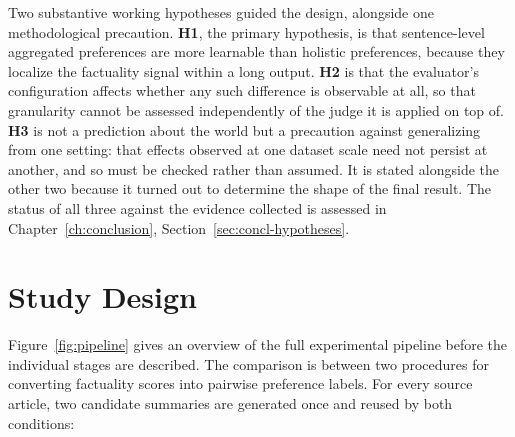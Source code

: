 Two substantive working hypotheses guided the design, alongside one
methodological precaution. \textbf{H1}, the primary hypothesis, is that
sentence-level aggregated preferences are more learnable than holistic
preferences, because they localize the factuality signal within a long output.
\textbf{H2} is that the evaluator's configuration affects whether any such
difference is observable at all, so that granularity cannot be assessed
independently of the judge it is applied on top of. \textbf{H3} is not a
prediction about the world but a precaution against generalizing from one
setting: that effects observed at one dataset scale need not persist at
another, and so must be checked rather than assumed. It is stated alongside the
other two because it turned out to determine the shape of the final result.
The status of all three against the evidence collected is assessed in
Chapter~\ref{ch:conclusion}, Section~\ref{sec:concl-hypotheses}.

\section{Study Design}
\label{sec:methodology-design}

Figure~\ref{fig:pipeline} gives an overview of the full experimental pipeline
before the individual stages are described. The comparison is between two
procedures for converting factuality scores into pairwise preference labels.
For every source article, two candidate summaries are generated once and
reused by both conditions:

